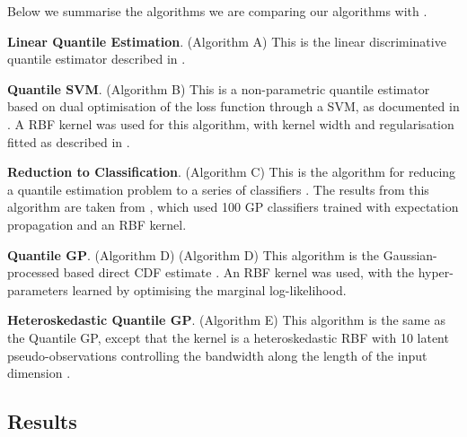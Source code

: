 \documentclass[twoside]{article} \usepackage{aistats2017}
\theoremstyle{definition}
\begin{document}
		Below we summarise the algorithms we are comparing our algorithms with \cite{Quadrianto2009}.
		
		\textbf{Linear Quantile Estimation}. (Algorithm A) This is the linear discriminative	quantile estimator described in \cite{Koenker1978}.
		
		\textbf{Quantile SVM}. (Algorithm B) This is a non-parametric quantile estimator based on dual optimisation of the loss function through a SVM, as documented in \cite{Takeuchi2006}. A RBF kernel was used for this algorithm, with kernel width and regularisation fitted as described in \cite{Quadrianto2009}.

		\textbf{Reduction to Classification}. (Algorithm C) This is the algorithm for reducing a quantile estimation problem to a series of classifiers \citep{Langford2006}. The results from this algorithm are taken from \cite{Quadrianto2009}, which used 100 GP classifiers trained with expectation propagation and an RBF kernel.
		
		\textbf{Quantile GP}. (Algorithm D) (Algorithm D) This algorithm is the Gaussian-processed based direct CDF estimate \cite{Quadrianto2009}. An RBF kernel was used, with the hyper-parameters learned by optimising the marginal log-likelihood.
		
		\textbf{Heteroskedastic Quantile GP}. (Algorithm E) This algorithm is the same as the Quantile GP, except that the kernel is a heteroskedastic RBF with 10 latent pseudo-observations controlling the bandwidth along the length of the input dimension \citep{Quadrianto2009}. 
		
	\subsection{Results}
	\label{sec:experiments:results}
	
\end{document}
